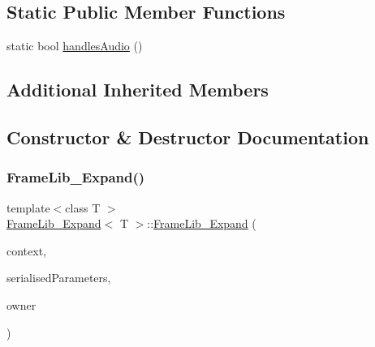 \subsection*{Static Public Member Functions}
\begin{DoxyCompactItemize}
\item 
static bool \hyperlink{class_frame_lib___expand_a77c0e4af675ebb2ac3f47b26939ab94b}{handles\+Audio} ()
\end{DoxyCompactItemize}
\subsection*{Additional Inherited Members}


\subsection{Constructor \& Destructor Documentation}
\mbox{\label{class_frame_lib___expand_a591240aee95c812856a9835b8014a915}} 
\subsubsection{\texorpdfstring{Frame\+Lib\+\_\+\+Expand()}{FrameLib\_Expand()}}
{\footnotesize\ttfamily template$<$class T $>$ \\
\hyperlink{class_frame_lib___expand}{Frame\+Lib\+\_\+\+Expand}$<$ T $>$\+::\hyperlink{class_frame_lib___expand}{Frame\+Lib\+\_\+\+Expand} (\begin{DoxyParamCaption}\item[{\hyperlink{class_frame_lib___context}{Frame\+Lib\+\_\+\+Context}}]{context,  }\item[{\hyperlink{class_frame_lib___parameters_1_1_serial}{Frame\+Lib\+\_\+\+Parameters\+::\+Serial} $\ast$}]{serialised\+Parameters,  }\item[{void $\ast$}]{owner }\end{DoxyParamCaption})\hspace{0.3cm}{\ttfamily [inline]}}

\mbox{\label{class_frame_lib___expand_a3aa2aa689e4b063fa65fe72be311c45f}} 
